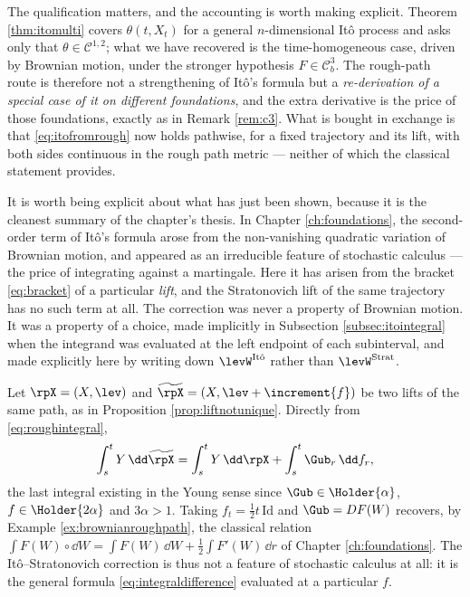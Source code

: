 The qualification matters, and the accounting is worth making explicit. Theorem
\ref{thm:itomulti} covers $\theta(t,X_t)$ for a general $n$-dimensional Itô process and asks only
that $\theta \in \mathcal{C}^{1,2}$; what we have recovered is the time-homogeneous case, driven by
Brownian motion, under the stronger hypothesis $F \in \mathcal{C}^3_b$. The rough-path route is
therefore not a strengthening of Itô's formula but a \emph{re-derivation of a special case of it on
different foundations}, and the extra derivative is the price of those foundations, exactly as in
Remark \ref{rem:c3}. What is bought in exchange is that \eqref{eq:itofromrough} now holds pathwise,
for a fixed trajectory and its lift, with both sides continuous in the rough path metric --- neither
of which the classical statement provides.

\medskip

It is worth being explicit about what has just been shown, because it is the cleanest summary of
the chapter's thesis. In Chapter \ref{ch:foundations}, the second-order term of It\^o's formula arose from
the non-vanishing quadratic variation of Brownian motion, and appeared as an irreducible feature of
stochastic calculus --- the price of integrating against a martingale. Here it has arisen from the
bracket \eqref{eq:bracket} of a particular \emph{lift}, and the Stratonovich lift of the same
trajectory has no such term at all. The correction was never a property of Brownian motion. It was
a property of a choice, made implicitly in Subsection \ref{subsec:itointegral} when the integrand
was evaluated at the left endpoint of each subinterval, and made explicitly here by writing down
$\levW^{\mathrm{It\hat o}}$ rather than $\levW^{\mathrm{Strat}}$.

Let $\rpX = (X,\lev)$ and $\widetilde\rpX = (X, \lev + \increment{f})$ be two lifts of the same
path, as in Proposition \ref{prop:liftnotunique}. Directly from \eqref{eq:roughintegral},
\begin{equation}\label{eq:integraldifference}
\int_s^t Y\,\dd\widetilde\rpX = \int_s^t Y\,\dd\rpX + \int_s^t \Gub_r\,\dd f_r ,
\end{equation}
the last integral existing in the Young sense since $\Gub \in \Holder{\alpha}$,
$f\in\Holder{2\alpha}$ and $3\alpha>1$. Taking $f_t = \tfrac12 t\,\mathrm{Id}$ and $\Gub = DF(W)$
recovers, by Example \ref{ex:brownianroughpath}, the classical relation
$\int F(W)\circ\dd W = \int F(W)\,\dd W + \tfrac12\int F'(W)\,\dd r$ of Chapter \ref{ch:foundations}. The
Itô--Stratonovich correction is thus not a feature of stochastic calculus at all: it is the general
formula \eqref{eq:integraldifference} evaluated at a particular $f$.


